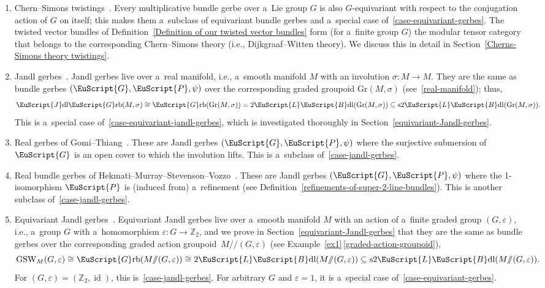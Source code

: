 \documentclass[pdftex]{sigma}
\numberwithin{equation}{section}
\def\mathscr#1{\EuScript{#1}}
\def\Z {\mathbb{Z}}
\def\subset{\subseteq}
\def\act#1#2{#1/\!\!/#2}
\newcommand{\id}{\operatorname{id}}
\newcommand{\LineBdl}{\mathscr{L}\mathscr{B}\mathrm{dl}}
\newcommand{\twoLineBdl}{2\LineBdl}
\newcommand{\stwoLineBdl}{\mathrm{s}2\LineBdl}
\newcommand{\Grb}{\mathscr{G}\mathrm{rb}}
\def\Gr{\mathrm{Gr}}
\begin{document}
\begin{enumerate}[(1)]
\item
Chern--Simons twistings~\cite{freed6}.
Every multiplicative bundle gerbe over a~Lie group $G$ is also $G$-equivariant with respect to the conjugation action of $G$ on itself; this makes them a~subclass of equivariant bundle gerbes and a~special case of~\ref{case-equivariant-gerbes}. The twisted vector bundles of Definition~\ref{Definition of our twisted vector bundles} form (for a~finite group $G$) the modular tensor category that belongs to the corresponding Chern--Simons theory (i.e., Dijkgraaf--Witten theory). We discuss this in detail in Section~\ref{Cherns-Simons theory twistings}.


\item
\label{case-jandl-gerbes}
Jandl gerbes~\cite{schreiber1}.
Jandl gerbes live over a~real manifold, i.e., a~smooth manifold $M$ with an involution $\sigma\colon M \to M$. They are the same as bundle gerbes $(\mathscr{G},\mathscr{P},\psi)$ over the corresponding graded groupoid $\Gr(M,\sigma)$ (see~\ref{real-manifold}); thus,
\begin{equation*}
\mathscr{J}\mathrm{dl}\Grb(M,\sigma)\cong\Grb(\Gr(M,\sigma))=\twoLineBdl(\Gr(M,\sigma))\subset \stwoLineBdl(\Gr(M,\sigma)).
\end{equation*}
This is a~special case of~\ref{case-equivariant-jandl-gerbes}, which is investigated thoroughly in Section~\ref{equivariant-Jandl-gerbes}.


\item
Real gerbes of Gomi--Thiang~\cite{Gomi2021}.
These are Jandl gerbes $(\mathscr{G},\mathscr{P},\psi)$ where the surjective submersion of $\mathscr{G}$ is an open cover to which the involution lifts. This is a~subclass of~\ref{case-jandl-gerbes}.


\item
\label{Real-bundle-gerbes}
Real bundle gerbes of Hekmati--Murray--Stevenson--Vozzo~\cite{Hekmati}.
These are Jandl gerbes $(\mathscr{G},\mathscr{P},\psi)$ where the 1-isomorphism $\mathscr{P}$ is (induced from) a~refinement (see Definition~\ref{refinements-of-super-2-line-bundles}). This is another subclass of~\ref{case-jandl-gerbes}.

\item
\label{case-equivariant-jandl-gerbes}
Equivariant Jandl gerbes~\cite{gawedzki8}.
Equivariant Jandl gerbes live over a~smooth manifold $M$ with an action of a~finite graded group $(G,\varepsilon)$, i.e., a~group $G$ with a~homomorphism $\varepsilon\colon G \to \Z_2$, and we prove in Section~\ref{equivariant-Jandl-gerbes} that they are the same as bundle gerbes over the corresponding graded action groupoid~${\act M{(G,\varepsilon)}}$ (see Example~\ref{ex1}\,\ref{graded-action-groupoid}),
\begin{equation*}
\mathrm{GSW}_M(G,\varepsilon)\cong\Grb(\act M{(G,\varepsilon)}) \cong \twoLineBdl(\act M{(G,\varepsilon)}) \subset \stwoLineBdl(\act M{(G,\varepsilon)}).
\end{equation*}
For $(G,\varepsilon)=(\Z_2,\id)$, this is~\ref{case-jandl-gerbes}. For arbitrary $G$ and $\varepsilon=1$, it is a~special case of~\ref{case-equivariant-gerbes}.


\end{enumerate}
\end{document}
